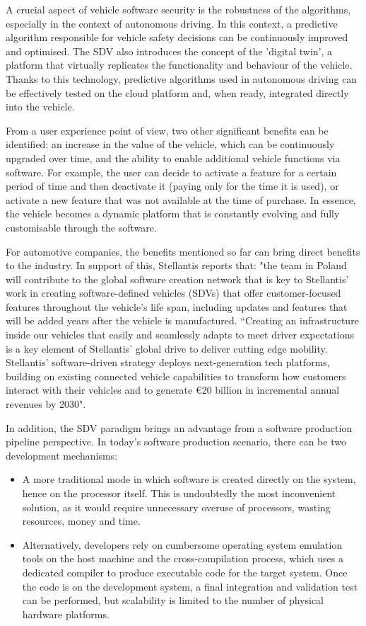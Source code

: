 \begin{itemize}
    A crucial aspect of vehicle software security is the robustness of the algorithms, especially in the context of autonomous driving. In this context, a predictive algorithm responsible for vehicle safety decisions can be continuously improved and optimised. The SDV also introduces the concept of the 'digital twin', a platform that virtually replicates the functionality and behaviour of the vehicle. Thanks to this technology, predictive algorithms used in autonomous driving can be effectively tested on the cloud platform and, when ready, integrated directly into the vehicle.
\end{itemize}

From a user experience point of view, two other significant benefits can be identified: an increase in the value of the vehicle, which can be continuously upgraded over time, and the ability to enable additional vehicle functions via software. For example, the user can decide to activate a feature for a certain period of time and then deactivate it (paying only for the time it is used), or activate a new feature that was not available at the time of purchase. In essence, the vehicle becomes a dynamic platform that is constantly evolving and fully customisable through the software.

For automotive companies, the benefits mentioned so far can bring direct benefits to the industry. In support of this, Stellantis reports that: "the team in Poland will contribute to the global software creation network that is key to Stellantis' work in creating software-defined vehicles (SDVs) that offer customer-focused features throughout the vehicle's life span, including updates and features that will be added years after the vehicle is manufactured. “Creating an infrastructure inside our vehicles that easily and seamlessly adapts to meet driver expectations is a key element of Stellantis' global drive to deliver cutting edge mobility. Stellantis' software-driven strategy deploys next-generation tech platforms, building on existing connected vehicle capabilities to transform how customers interact with their vehicles and to generate €20 billion in incremental annual revenues by 2030".

In addition, the SDV paradigm brings an advantage from a software production pipeline perspective. In today's software production scenario, there can be two development mechanisms:
\begin{itemize}
    \item A more traditional mode in which software is created directly on the system, hence on the processor itself. This is undoubtedly the most inconvenient solution, as it would require unnecessary overuse of processors, wasting resources, money and time.
    \item Alternatively, developers rely on cumbersome operating system emulation tools on the host machine and the cross-compilation process, which uses a dedicated compiler to produce executable code for the target system. Once the code is on the development system, a final integration and validation test can be performed, but scalability is limited to the number of physical hardware platforms. 
\end{itemize}

